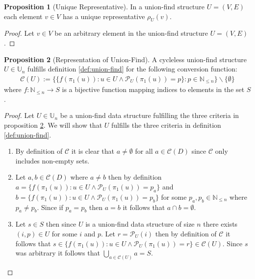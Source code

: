 \documentclass[a4paper,12pt]{article}
\theoremstyle{definition}
\newtheorem{proposition}{Proposition}[section]
\begin{document}
\begin{proposition}[Unique Representative]
    In a union-find structure $U = (V, E)$ each element $v \in V$ has a unique
    representative $\rho_U(v)$.
\end{proposition}
\begin{proof}
    Let $v \in V$ be an arbitrary element in the union-find structure $U =
    (V, E)$.
\end{proof}

\begin{proposition}[Representation of
    Union-Find]\label{def:representation-union-find} A cycleless union-find structure $U
    \in \mathbb{U}_n$ fulfills definition \ref{def:union-find} for the following conversion function:
    \begin{align*}
        \mathcal{C}(U) := \{\{f(\pi_1(u)) : u \in U \land \mathcal{P}_U(\pi_1(u)) = p \} : p \in \mathbb{N}_{\leq n}\} \backslash \{\emptyset\}
    \end{align*}
    where $f : \mathbb{N}_{\leq n} \to S$ is a bijective function mapping
    indices to elements in the set $S$.
\end{proposition}
\begin{proof}
    Let $U \in \mathbb{U}_n$ be a union-find data structure fulfilling the three
    criteria in proposition \ref{def:representation-union-find}. We will show
    that $U$ fulfills the three criteria in definition \ref{def:union-find}.

    \begin{enumerate}
        \item By definition of $\mathcal{C}$ it is clear that $a \neq \emptyset$
        for all $a \in \mathcal{C}(D)$ since $\mathcal{C}$ only includes
        non-empty sets.
        \item Let $a, b \in \mathcal{C}(D)$ where $a \neq b$ then by definition
        $a = \{f(\pi_1(u)) : u \in U \land \mathcal{P}_U(\pi_1(u)) = p_a \}$ and
        $b = \{f(\pi_1(u)) : u \in U \land \mathcal{P}_U(\pi_1(u)) = p_b \}$ for
        some $p_a, p_b \in \mathbb{N}_{\leq n}$ where $p_a \neq p_b$. Since if
        $p_a = p_b$ then $a = b$ it follows that $a \cap b = \emptyset$.
        \item Let $s \in S$ then since $U$ is a union-find data structure of size
        $n$ there exists $(i, p) \in U$ for some $i$ and $p$. Let $r =
        \mathcal{P}_U(i)$ then by definition of $\mathcal{C}$ it follows that $s
        \in \{f(\pi_1(u)) : u \in U \land \mathcal{P}_U(\pi_1(u)) = r \} \in
        \mathcal{C}(U)$. Since $s$ was arbitrary it follows that $\bigcup_{a \in
        \mathcal{C}(U)} a = S$.
    \end{enumerate}
\end{proof}
\end{document}
